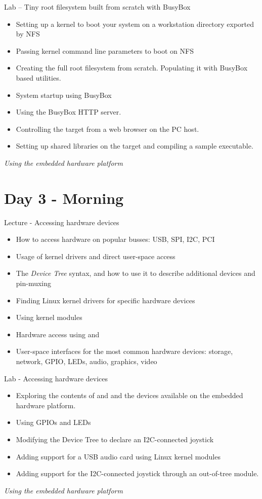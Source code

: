 \documentclass[a4paper,12pt,obeyspaces,spaces,hyphens]{article}
\begin{document}
\feagendaonecolumn
{Lab – Tiny root filesystem built from scratch with BusyBox}
{
  \begin{itemize}
  \item Setting up a kernel to boot your system on a workstation
    directory exported by NFS
  \item Passing kernel command line parameters to boot on NFS
  \item Creating the full root filesystem from scratch.
    Populating it with BusyBox based utilities.
  \item System startup using BusyBox 
  \item Using the BusyBox HTTP server.
  \item Controlling the target from a web browser on the PC host.
  \item Setting up shared libraries on the target and compiling
    a sample executable.
  \end{itemize}

  \vspace{0.5cm}
  {\em Using the embedded hardware platform}
}

\section{Day 3 - Morning}

\feagendatwocolumn
{Lecture - Accessing hardware devices}
{
  \begin{itemize}
  \item How to access hardware on popular busses: USB, SPI, I2C, PCI
  \item Usage of kernel drivers and direct user-space access
  \item The {\em Device Tree} syntax, and how to use it to describe
    additional devices and pin-muxing
  \item Finding Linux kernel drivers for specific hardware devices
  \item Using kernel modules
  \item Hardware access using  and 
  \item User-space interfaces for the most common hardware devices:
    storage, network, GPIO, LEDs, audio, graphics, video
  \end{itemize}
}
{Lab - Accessing hardware devices}
{
  \begin{itemize}
  \item Exploring the contents of  and  and the
    devices available on the embedded hardware platform.
  \item Using GPIOs and LEDs
  \item Modifying the Device Tree to declare an I2C-connected
        joystick
  \item Adding support for a USB audio card using Linux kernel modules
  \item Adding support for the I2C-connected joystick through
        an out-of-tree module.
  \end{itemize}

  \vspace{0.5cm}
  {\em Using the embedded hardware platform}
}
\end{document}
